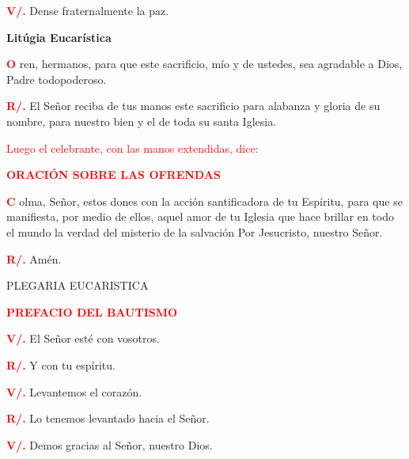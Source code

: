 \documentclass[12pt, letterpaper, spanish]{article}
\begin{document}
  \Large {\bfseries \textcolor{red}{V/.}} \hspace{0.5cm} Dense fraternalmente la paz. 

  \clearpage

  \begin{center}
  \Huge {\bfseries Lit\'ugia Eucar\'istica}
  \end{center}

  \lettrine[lines=2]{\bfseries \textcolor{red}{O}}{} \Large ren, hermanos, para que este sacrificio, m\'io y de ustedes, sea agradable a Dios, Padre todopoderoso. 

  \Large {\bfseries \textcolor{red}{R/.}} \hspace{0.5cm} El Se\~nor reciba de tus manos este sacrificio para alabanza y gloria de su nombre, para nuestro bien y el de toda su santa Iglesia. 

  \large {\textcolor{red}{Luego el celebrante, con las manos extendidas, dice:}}

  \large {\bfseries \textcolor{red}{ORACIÓN SOBRE LAS OFRENDAS}}

  \lettrine[lines=2]{\bfseries \textcolor{red}{C}}{} \Large olma, Señor, estos dones con la acción santificadora de tu Espíritu, para que se manifiesta, por medio de ellos, aquel amor de tu Iglesia que hace brillar en todo el mundo la verdad del misterio de la salvación Por Jesucristo, nuestro Señor.

  \Large {\bfseries \textcolor{red}{R/.}} \hspace{0.5cm} Am\'en.

  \begin{center}
    \Large PLEGARIA EUCARISTICA
  \end{center}

  \Large {\bfseries \textcolor{red}{PREFACIO DEL BAUTISMO}} 

  \Large {\bfseries \textcolor{red}{V/.}} \hspace{0.5cm} El Se\~nor est\'e con vosotros.

  \Large {\bfseries \textcolor{red}{R/.}} \hspace{0.5cm} Y con tu esp\'iritu. 

  \Large {\bfseries \textcolor{red}{V/.}} \hspace{0.5cm} Levantemos el coraz\'on.

  \Large {\bfseries \textcolor{red}{R/.}} \hspace{0.5cm} Lo tenemos levantado hacia el Se\~nor. 

  \Large {\bfseries \textcolor{red}{V/.}} \hspace{0.5cm} Demos gracias al Se\~nor, nuestro Dios.
\end{document}
